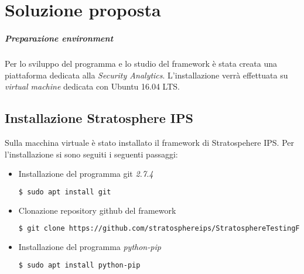 \documentclass[../main.tex]{subfiles}
\begin{document}
\chapter{Soluzione proposta}
\paragraph{Preparazione environment}
Per lo sviluppo del programma e lo studio del framework è stata creata una piattaforma dedicata alla \textit{Security Analytics}. L'installazione verrà effettuata su \textit{virtual machine} dedicata con Ubuntu 16.04 LTS.

\section{Installazione Stratosphere IPS}
Sulla macchina virtuale è stato installato il framework di Stratospehere IPS. Per l'installazione si sono seguiti i seguenti passaggi:

\begin{itemize}
				\item Installazione del programma git \textit{2.7.4}
\begin{lstlisting}[language=bash]
$ sudo apt install git
\end{lstlisting}

				\item Clonazione repository github del framework
\begin{lstlisting}[language=bash]
$ git clone https://github.com/stratosphereips/StratosphereTestingFramework
\end{lstlisting}

				\item Installazione del programma \textit{python-pip}
\begin{lstlisting}[language=bash]
$ sudo apt install python-pip
\end{lstlisting}
\end{itemize}
				
\end{document}
